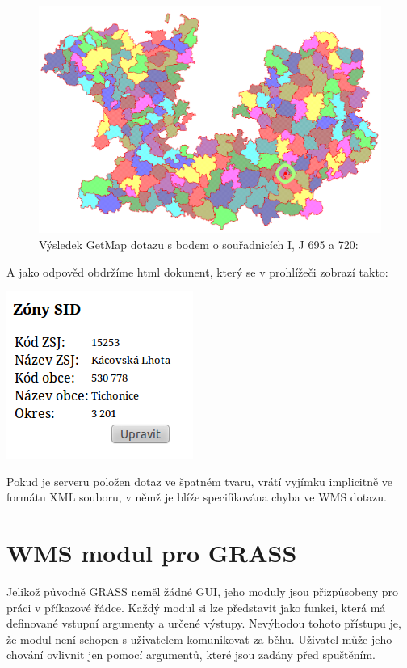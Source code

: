 \documentclass[a4paper,12pt]{article}
\begin{document}
  
\begin{figure}[h!]
 \includegraphics[scale=0.3]{figures/getfeatureinfo}
  \caption{Výsledek GetMap dotazu s bodem o souřadnicích I, J  695 a 720:}
\end{figure}

A jako odpověd obdržíme html dokunent, který se v prohlížeči zobrazí takto:

 \includegraphics[scale=0.7]{figures/getfeatureinforeply}


Pokud je serveru položen dotaz ve špatném tvaru, vrátí vyjímku implicitně ve formátu XML souboru, v němž je blíže specifikována chyba ve WMS dotazu. 


\newpage

\section{WMS modul pro GRASS}

Jelikož původně GRASS neměl žádné GUI, jeho moduly jsou přizpůsobeny pro práci v příkazové řádce. Každý modul si lze představit jako funkci, která má definované vstupní argumenty a určené výstupy. Nevýhodou tohoto 
přístupu je, že modul není schopen s uživatelem komunikovat za běhu. Uživatel může jeho chování ovlivnit jen pomocí argumentů, které jsou zadány před spuštěním.
\end{document}
